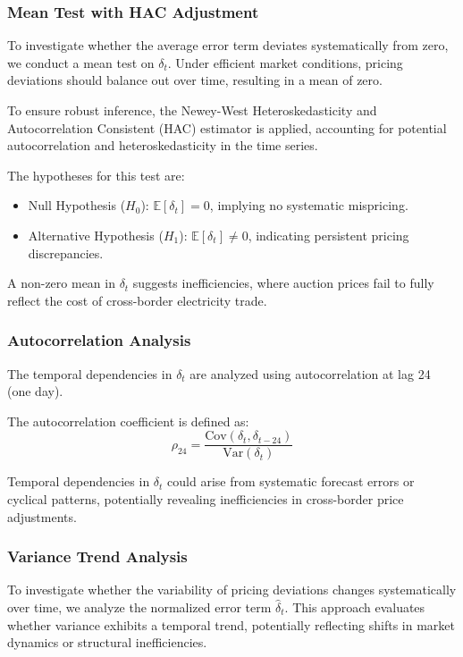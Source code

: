 \documentclass[12pt]{article}
\begin{document}
\subsubsection*{Mean Test with HAC Adjustment}

To investigate whether the average error term deviates systematically from zero, we conduct a mean test on $\delta_t$. Under efficient market conditions, pricing deviations should balance out over time, resulting in a mean of zero.

To ensure robust inference, the Newey-West Heteroskedasticity and Autocorrelation Consistent (HAC) estimator is applied, accounting for potential autocorrelation and heteroskedasticity in the time series.

The hypotheses for this test are:
\begin{itemize}
    \item Null Hypothesis ($H_0$): $\mathbb{E}[\delta_t] = 0$, implying no systematic mispricing.
    \item Alternative Hypothesis ($H_1$): $\mathbb{E}[\delta_t] \neq 0$, indicating persistent pricing discrepancies.
\end{itemize}

A non-zero mean in $\delta_t$ suggests inefficiencies, where auction prices fail to fully reflect the cost of cross-border electricity trade.

\subsubsection*{Autocorrelation Analysis}

The temporal dependencies in $\delta_t$ are analyzed using autocorrelation at lag 24 (one day).

The autocorrelation coefficient is defined as:
\begin{equation}
    \rho_{24} = \frac{\text{Cov}(\delta_t, \delta_{t-24})}{\text{Var}(\delta_t)}
\end{equation}

Temporal dependencies in $\delta_t$ could arise from systematic forecast errors or cyclical patterns, potentially revealing inefficiencies in cross-border price adjustments.

\subsubsection*{Variance Trend Analysis}

To investigate whether the variability of pricing deviations changes systematically over time, we analyze the normalized error term $\hat{\delta}_t$. This approach evaluates whether variance exhibits a temporal trend, potentially reflecting shifts in market dynamics or structural inefficiencies. 
\end{document}
